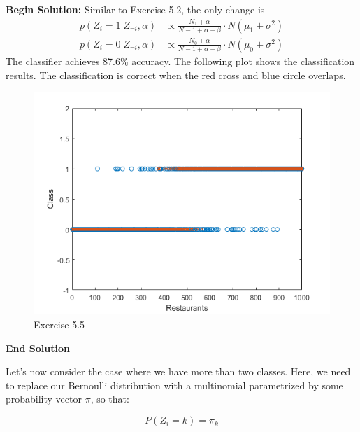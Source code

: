 \documentclass[twoside]{article}
\begin{document}
\textbf{Begin Solution:}
Similar to Exercise 5.2, the only change is
\begin{equation*}
\begin{split}
p(Z_i=1|Z_{\neg i},\alpha)&\propto \frac{N_1+\alpha}{N-1+\alpha+\beta}\cdot N(\mu_1+\sigma^2)\\
p(Z_i=0|Z_{\neg i},\alpha)&\propto \frac{N_0+\alpha}{N-1+\alpha+\beta}\cdot N(\mu_0+\sigma^2)
\end{split}
\end{equation*}
The classifier achieves 87.6\% accuracy. The following plot shows the classification results. The classification is correct when the red cross and blue circle overlaps.
\begin{figure}[H]
\begin{center}
\includegraphics[width=\textwidth]{./exercise_5_5/class.png}
\end{center}
\caption{Exercise 5.5}
\end{figure} 

\textbf{End Solution}

Let's now consider the case where we have more than two classes. Here, we need to replace our Bernoulli distribution with a multinomial parametrized by some probability vector $\pi$, so that:

$$P(Z_i = k) = \pi_k$$
\end{document}
